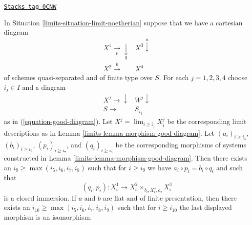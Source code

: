 \begin{lemma}
\label{limits-lemma-good-diagram-fibre-product}
\href{https://stacks.math.columbia.edu/tag/0CNW}{\texttt{Stacks tag 0CNW}}

In Situation \ref{limits-situation-limit-noetherian} suppose that we have a
cartesian diagram
$$
\begin{array}{cc}X^1 \underset{p}{\longrightarrow}\underset{q}{\downarrow} & X^3 \overset{a}{\downarrow} \\ X^2 \overset{b}{\longrightarrow} & X^4\end{array}
$$
of schemes quasi-separated and of finite type over $S$.
For each $j = 1, 2, 3, 4$ choose $i_j \in I$ and a diagram
$$
\begin{array}{cc}X^j \longrightarrow\downarrow & W^j \downarrow \\ S \longrightarrow & S_{i_j}\end{array}
$$
as in (\ref{equation-good-diagram}). Let
$X^j = \lim_{i \geq i_j} X^j_i$ be the corresponding limit descriptions
as in Lemma \ref{limits-lemma-morphism-good-diagram}.
Let $(a_i)_{i \geq i_5}$, $(b_i)_{i \geq i_6}$, $(p_i)_{i \geq i_7}$, and
$(q_i)_{i \geq i_8}$ be the corresponding morphisms of systems constructed
in Lemma \ref{limits-lemma-morphism-good-diagram}. Then there exists an
$i_9 \geq \max(i_5, i_6, i_7, i_8)$ such that for $i \geq i_9$ we have
$a_i \circ p_i = b_i \circ q_i$ and such that
$$
(q_i, p_i) : X^1_i \longrightarrow X^2_i \times_{b_i, X^4_i, a_i} X^3_i
$$
is a closed immersion.
If $a$ and $b$ are flat and of finite presentation, then there exists an
$i_{10} \geq \max(i_5, i_6, i_7, i_8, i_9)$ such that for $i \geq i_{10}$
the last displayed morphism is an isomorphism.
\end{lemma}

